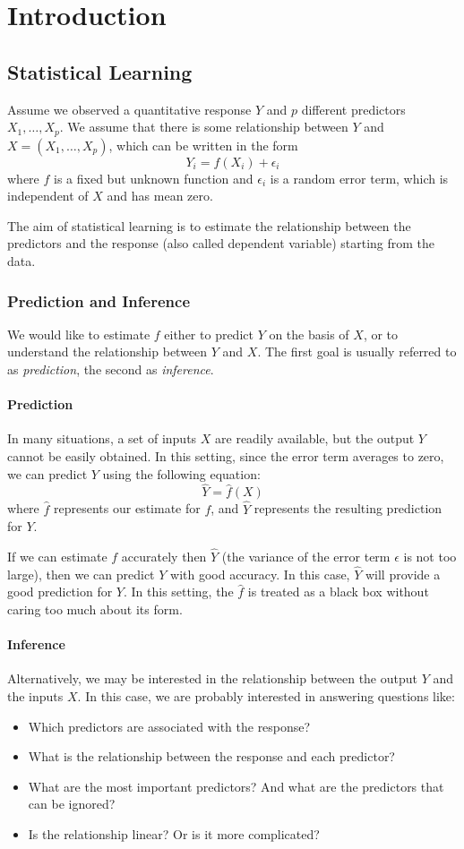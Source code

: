 \chapter*{Introduction}
\section*{Statistical Learning}
Assume we observed a quantitative response $Y$ and $p$ different predictors $X_1,\dots,X_p$. We assume that there is some relationship between $Y$ and $X=(X_1,\dots,X_p)$, which can be written in the form
$$
Y_i=f(X_i)+\epsilon_i
$$
where $f$ is a fixed but unknown function and $\epsilon_i$ is a random error term, which is independent of $X$ and has mean zero.  

The aim of statistical learning is to estimate the relationship between the predictors and the response (also called dependent variable) starting from the data.

\subsection*{Prediction and Inference}

We would like to estimate $f$ either to predict $Y$ on the basis of $X$, or to understand the relationship between $Y$ and $X$. The first goal is usually referred to as \textit{prediction}, the second as \textit{inference}.

\subsubsection*{Prediction}
In many situations, a set of inputs $X$ are readily available, but the output $Y$ cannot be easily obtained. In this setting, since the error term averages to zero, we can predict $Y$ using the following equation:
$$
\hat{Y}=\hat{f}(X)
$$
where $\hat{f}$ represents our estimate for $f$, and $\hat{Y}$ represents the resulting prediction for $Y$.

If we can estimate $f$ accurately then $\hat{Y}$ (the variance of the error term $\epsilon$ is not too large), then we can predict $Y$ with good accuracy. In this case, $\hat{Y}$ will provide a good prediction for $Y$. In this setting, the $\hat{f}$ is treated as a black box without caring too much about its form.

\subsubsection*{Inference}
Alternatively, we may be interested in the relationship between the output $Y$ and the inputs $X$. In this case, we are probably interested in answering questions like:
\begin{itemize}
    \item Which predictors are associated with the response?
    \item What is the relationship between the response and each predictor?
    \item What are the most important predictors? And what are the predictors that can be ignored?
    \item Is the relationship linear? Or is it more complicated?
\end{itemize}

